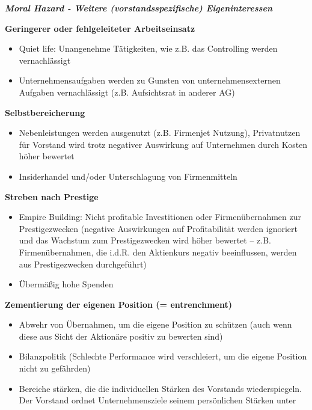 \documentclass[
]{article}
\providecommand{\tightlist}{%
  \setlength{\itemsep}{0pt}\setlength{\parskip}{0pt}}
\begin{document}
\textbf{\emph{Moral Hazard - Weitere (vorstandsspezifische)
Eigeninteressen}}

\textbf{Geringerer oder fehlgeleiteter Arbeitseinsatz}

\begin{itemize}
\tightlist
\item
  Quiet life: Unangenehme Tätigkeiten, wie z.B. das Controlling werden
  vernachlässigt
\item
  Unternehmensaufgaben werden zu Gunsten von unternehmensexternen
  Aufgaben vernachlässigt (z.B. Aufsichtsrat in anderer AG)
\end{itemize}

\textbf{Selbstbereicherung}

\begin{itemize}
\tightlist
\item
  Nebenleistungen werden ausgenutzt (z.B. Firmenjet Nutzung),
  Privatnutzen für Vorstand wird trotz negativer Auswirkung auf
  Unternehmen durch Kosten höher bewertet
\item
  Insiderhandel und/oder Unterschlagung von Firmenmitteln
\end{itemize}

\textbf{Streben nach Prestige}

\begin{itemize}
\tightlist
\item
  Empire Building: Nicht profitable Investitionen oder Firmenübernahmen
  zur Prestigezwecken (negative Auswirkungen auf Profitabilität werden
  ignoriert und das Wachstum zum Prestigezwecken wird höher bewertet --
  z.B. Firmenübernahmen, die i.d.R. den Aktienkurs negativ beeinflussen,
  werden aus Prestigezwecken durchgeführt)
\item
  Übermäßig hohe Spenden
\end{itemize}

\textbf{Zementierung der eigenen Position (= entrenchment)}

\begin{itemize}
\tightlist
\item
  Abwehr von Übernahmen, um die eigene Position zu schützen (auch wenn
  diese aus Sicht der Aktionäre positiv zu bewerten sind)
\item
  Bilanzpolitik (Schlechte Performance wird verschleiert, um die eigene
  Position nicht zu gefährden)
\item
  Bereiche stärken, die die individuellen Stärken des Vorstands
  wiederspiegeln. Der Vorstand ordnet Unternehmensziele seinem
  persönlichen Stärken unter
\end{itemize}
\end{document}
